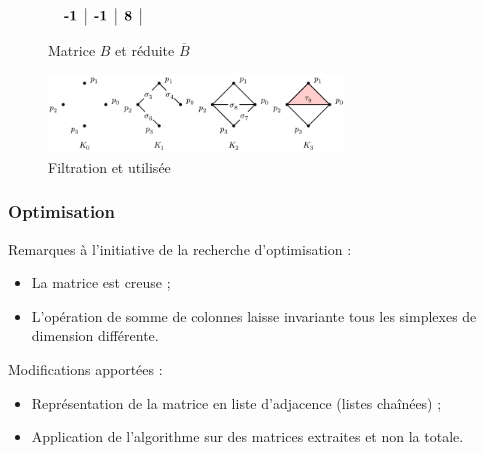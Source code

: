 \documentclass{beamer}
\begin{document}
\begin{frame}
\begin{figure}
\begin{math}
\begin{array}{cc}
\begin{tabular}{ c | c | c | c | c | c | c }
                \textbf{-1} & \textbf{-1} & \textbf{8}
            \end{tabular}
        \end{array}
        \end{math}
        \caption{Matrice $B$ et réduite $\overline{B}$}
    \end{figure}
    \begin{figure}
        \centering
        \includegraphics[width=0.7\textwidth]{../images/filtration_horizontal.png}
        \caption{Filtration et utilisée}
    \end{figure}
\end{frame}

\begin{frame}
    \frametitle{Optimisation}
    Remarques à l'initiative de la recherche d'optimisation :
    \begin{itemize}
        \item La matrice est creuse ;
        \item L'opération de somme de colonnes laisse invariante tous les simplexes de dimension différente.
    \end{itemize}

    Modifications apportées :
    \begin{itemize}
        \item Représentation de la matrice en liste d'adjacence (listes chaînées) ;
        \item Application de l'algorithme sur des matrices extraites et non la totale.
    \end{itemize}
\end{frame}
\end{document}
